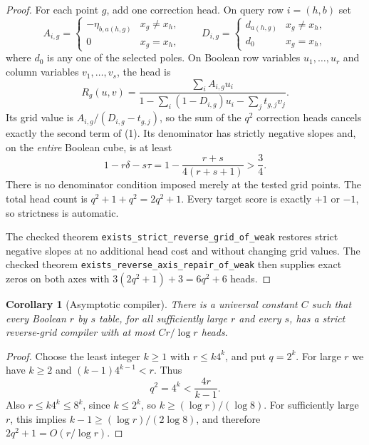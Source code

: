 \documentclass[11pt]{article}
\newtheorem{corollary}{Corollary}
\begin{document}
\begin{proof}
For each point $g$, add one correction head. On query row $i=(h,b)$ set
\[
 A_{i,g}=
 \begin{cases}-\eta_{b,a(h,g)}&x_g\ne x_h,\\0&x_g=x_h,\end{cases}
 \qquad
 D_{i,g}=
 \begin{cases}d_{a(h,g)}&x_g\ne x_h,\\d_0&x_g=x_h,\end{cases}
\]
where $d_0$ is any one of the selected poles. On Boolean row variables
$u_1,\ldots,u_r$ and column variables $v_1,\ldots,v_s$, the head is
\[
 R_g(u,v)=
 \frac{\sum_i A_{i,g}u_i}
 {1-\sum_i(1-D_{i,g})u_i-\sum_j t_{g,j}v_j}.
 \tag{2}
\]
Its grid value is $A_{i,g}/(D_{i,g}-t_{g,j})$, so the sum of the $q^2$
correction heads cancels exactly the second term of (1). Its denominator
has strictly negative slopes and, on the \emph{entire} Boolean cube, is at least
\[
 1-r\delta-s\tau
 =1-\frac{r+s}{4(r+s+1)}>\frac34.
\]
There is no denominator condition imposed merely at the tested grid points.
The total head count is $q^2+1+q^2=2q^2+1$. Every target score is exactly
$+1$ or $-1$, so strictness is automatic.

The checked theorem \texttt{exists\_strict\_reverse\_grid\_of\_weak} restores
strict negative slopes at no additional head cost and without changing grid
values. The checked theorem \texttt{exists\_reverse\_axis\_repair\_of\_weak}
then supplies exact zeros on both axes with $3(2q^2+1)+3=6q^2+6$ heads.
\end{proof}

\begin{corollary}[Asymptotic compiler]
There is a universal constant $C$ such that every Boolean $r$ by $s$ table,
for all sufficiently large $r$ and every $s$, has a strict reverse-grid
compiler with at most $Cr/\log r$ heads.
\end{corollary}
\begin{proof}
Choose the least integer $k\geq1$ with $r\leq k4^k$, and put $q=2^k$.
For large $r$ we have $k\geq2$ and $(k-1)4^{k-1}<r$. Thus
\[
 q^2=4^k<\frac{4r}{k-1}.
\]
Also $r\leq k4^k\leq8^k$, since $k\leq2^k$, so
$k\geq(\log r)/(\log8)$. For sufficiently large $r$, this implies
$k-1\geq(\log r)/(2\log8)$, and therefore
$2q^2+1=O(r/\log r)$.
\end{proof}
\end{document}
